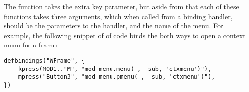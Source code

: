 The  function takes the extra key parameter, but
aside from that each of these functions takes three arguments, which when
called from a binding handler, should be the parameters to the handler, and
the name of the menu. For example, the following snippet of of code binds
the both ways to open a context menu for a frame:

\begin{verbatim}
defbindings("WFrame", {
    kpress(MOD1.."M", "mod_menu.menu(_, _sub, 'ctxmenu')"),
    mpress("Button3", "mod_menu.pmenu(_, _sub, 'ctxmenu')"),
})
\end{verbatim}
